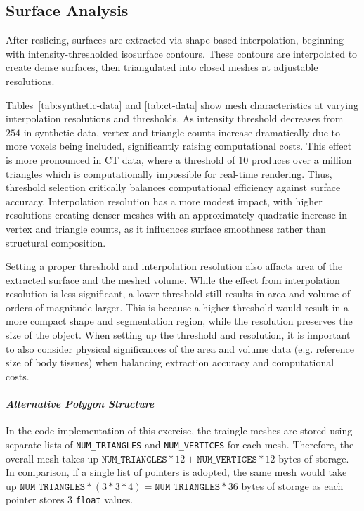 \documentclass[11pt, twocolumn]{article}
\begin{document}
\subsection{Surface Analysis}
After reslicing, surfaces are extracted via shape-based interpolation, beginning with intensity-thresholded isosurface contours. These contours are interpolated to create dense surfaces, then triangulated into closed meshes at adjustable resolutions.

Tables~\ref{tab:synthetic-data} and \ref{tab:ct-data} show mesh characteristics at varying interpolation resolutions and thresholds. As intensity threshold decreases from $254$ in synthetic data, vertex and triangle counts increase dramatically due to more voxels being included, significantly raising computational costs. This effect is more pronounced in CT data, where a threshold of $10$ produces over a million triangles which is computationally impossible for real-time rendering. Thus, threshold selection critically balances computational efficiency against surface accuracy.
Interpolation resolution has a more modest impact, with higher resolutions creating denser meshes with an approximately quadratic increase in vertex and triangle counts, as it influences surface smoothness rather than structural composition.

Setting a proper threshold and interpolation resolution also affacts area of the extracted surface and the meshed volume. While the effect from interpolation resolution is less significant, a lower threshold still results in area and volume of orders of magnitude larger. This is because a higher threshold would result in a more compact shape and segmentation region, while the resolution preserves the size of the object. When setting up the threshold and resolution, it is important to also consider physical significances of the area and volume data (e.g. reference size of body tissues) when balancing extraction accuracy and computational costs.

\paragraph{\textit{Alternative Polygon Structure}}
In the code implementation of this exercise, the traingle meshes are stored using separate lists of \texttt{NUM\_TRIANGLES} and \texttt{NUM\_VERTICES} for each mesh. Therefore, the overall mesh takes up $\texttt{NUM\_TRIANGLES} * 12 + \texttt{NUM\_VERTICES} * 12$ bytes of storage. 
In comparison, if a single list of pointers is adopted, the same mesh would take up $\texttt{NUM\_TRIANGLES} * (3 * 3 * 4) = \texttt{NUM\_TRIANGLES} * 36$ bytes of storage as each pointer stores 3 \texttt{float} values.
\end{document}
